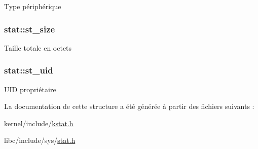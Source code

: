 Type périphérique \hypertarget{structstat_a040e19c8b9766f841fde8786ce9297bf}{
\subsubsection[{st\+\_\+size}]{ stat\+::st\+\_\+size}}\label{structstat_a040e19c8b9766f841fde8786ce9297bf}
Taille totale en octets \hypertarget{structstat_a4a8708a3d18be60ee7b2f06c4cab0c70}{
\subsubsection[{st\+\_\+uid}]{ stat\+::st\+\_\+uid}}\label{structstat_a4a8708a3d18be60ee7b2f06c4cab0c70}
U\+I\+D propriétaire 

La documentation de cette structure a été générée à partir des fichiers suivants \+:\begin{DoxyCompactItemize}
\item 
kernel/include/\hyperlink{kstat_8h}{kstat.\+h}\item 
libc/include/sys/\hyperlink{stat_8h}{stat.\+h}\end{DoxyCompactItemize}
